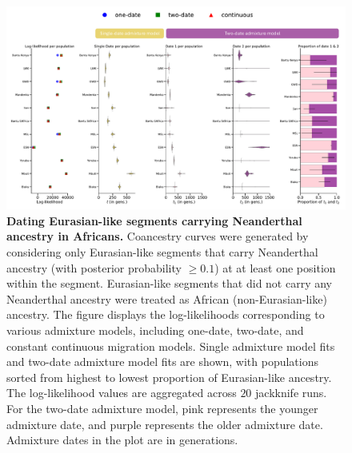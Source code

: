 \begin{figure}
    \centering
    \includegraphics[width=\linewidth]{figures/gb_bta/gb_real_bta_17.pdf}
    \caption{\textbf{Dating Eurasian-like segments carrying Neanderthal ancestry in Africans.} Coancestry curves were generated by considering only Eurasian-like segments that carry Neanderthal ancestry (with posterior probability $\geq 0.1$) at at least one position within the segment. Eurasian-like segments that did not carry any Neanderthal ancestry were treated as African (non-Eurasian-like) ancestry. The figure displays the log-likelihoods corresponding to various admixture models, including one-date, two-date, and constant continuous migration models. Single admixture model fits and two-date admixture model fits are shown, with populations sorted from highest to lowest proportion of Eurasian-like ancestry. The log-likelihood values are aggregated across $20$ jackknife runs. For the two-date admixture model, pink represents the younger admixture date, and purple represents the older admixture date. Admixture dates in the plot are in generations.}
    \label{fig:gb-bta-nea-supp3}
\end{figure}


